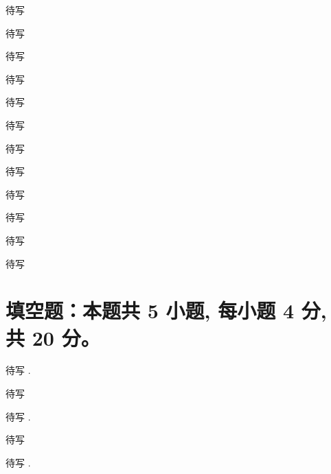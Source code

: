 \begin{question}
  待写 \paren[]

  \begin{choices}
    \item 待写
    \item 待写
    \item 待写
    \item 待写
  \end{choices}
\end{question}

\begin{solution}
  待写
\end{solution}

\begin{question}
  待写 \paren[]

  \begin{choices}
    \item 待写
    \item 待写
    \item 待写
    \item 待写
  \end{choices}
\end{question}

\begin{solution}
  待写
\end{solution}


\section{填空题：本题共 5 小题, 每小题 4 分, 共 20 分。}



\begin{question}
  待写 \fillin[].
\end{question}

\begin{solution}
  待写
\end{solution}

\begin{question}
  待写 \fillin[].
\end{question}

\begin{solution}
  待写
\end{solution}

\begin{question}
  待写 \fillin[].
\end{question}

